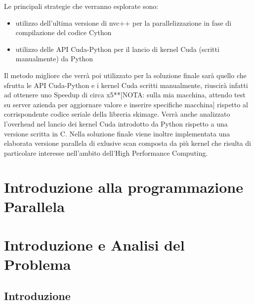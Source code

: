 \documentclass[12pt,a4paper]{report}
\begin{document}
Le principali strategie che verranno esplorate sono:
\begin{itemize}
\item utilizzo dell'ultima versione di nvc++ per la parallelizzazione in fase di compilazione del codice Cython
\item utilizzo delle API Cuda-Python per il lancio di kernel Cuda (scritti manualmente) da Python 
\end{itemize}
Il metodo migliore che verrà poi utilizzato per la soluzione finale sarà quello che sfrutta le API Cuda-Python e i kernel Cuda scritti manualmente, riuscirà infatti ad ottenere uno Speedup di circa x5**[NOTA: sulla mia macchina,  attendo test su server azienda per aggiornare valore e inserire specifiche macchina] %
 rispetto al corrispondente codice seriale della libreria skimage. Verrà anche analizzato l'overhead nel lancio dei kernel Cuda introdotto da Python rispetto a una versione scritta in C. \newline
Nella soluzione finale viene inoltre implementata una elaborata versione parallela di exlusive scan composta da più kernel che risulta di particolare interesse nell'ambito dell'High Performance Computing.

\chapter{Introduzione alla programmazione Parallela}

\chapter{Introduzione e Analisi del Problema}
\section{Introduzione}
\end{document}
